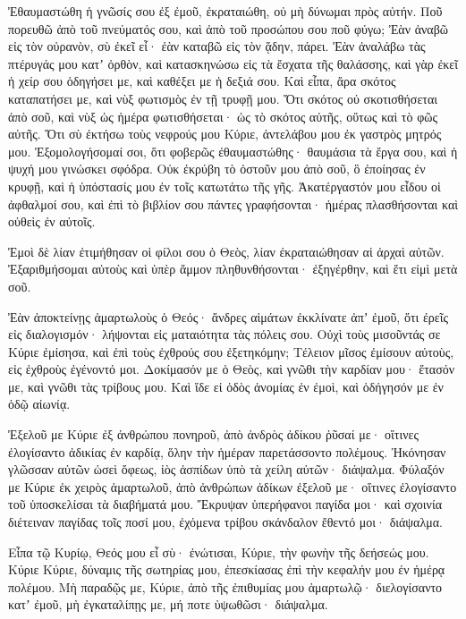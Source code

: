 \begin{spacing}{1.1}
\begin{multicols}{2}
Ἐθαυμαστώθη ἡ γνῶσίς σου ἐξ ἐμοῦ, ἐκραταιώθη, οὐ μὴ δύνωμαι πρὸς αὐτήν.
Ποῦ πορευθῶ ἀπὸ τοῦ πνεύματός σου, καὶ ἀπὸ τοῦ προσώπου σου ποῦ φύγω;
Ἐὰν ἀναβῶ εἰς τὸν οὐρανὸν, σὺ ἐκεῖ εἶ· ἐὰν καταβῶ εἰς τὸν ᾅδην, πάρει.
Ἐὰν ἀναλάβω τὰς πτέρυγάς μου κατʼ ὀρθὸν, καὶ κατασκηνώσω εἰς τὰ ἔσχατα τῆς θαλάσσης,
καὶ γὰρ ἐκεῖ ἡ χείρ σου ὁδηγήσει με, καὶ καθέξει με ἡ δεξιά σου.
Καὶ εἶπα, ἄρα σκότος καταπατήσει με, καὶ νὺξ φωτισμὸς ἐν τῇ τρυφῇ μου.
Ὅτι σκότος οὐ σκοτισθήσεται ἀπὸ σοῦ, καὶ νὺξ ὡς ἡμέρα φωτισθήσεται· ὡς τὸ σκότος αὐτῆς, οὕτως καὶ τὸ φῶς αὐτῆς.
Ὅτι σὺ ἐκτήσω τοὺς νεφρούς μου Κύριε, ἀντελάβου μου ἐκ γαστρὸς μητρός μου.
Ἐξομολογήσομαί σοι, ὅτι φοβερῶς ἐθαυμαστώθης· θαυμάσια τὰ ἔργα σου, καὶ ἡ ψυχή μου γινώσκει σφόδρα.
Οὐκ ἐκρύβη τὸ ὀστοῦν μου ἀπὸ σοῦ, ὃ ἐποίησας ἐν κρυφῇ, καὶ ἡ ὑπόστασίς μου ἐν τοῖς κατωτάτω τῆς γῆς.
Ἀκατέργαστόν μου εἶδου οἱ ἀφθαλμοί σου, καὶ ἐπὶ τὸ βιβλίον σου πάντες γραφήσονται· ἡμέρας πλασθήσονται καὶ οὐθεὶς ἐν αὐτοῖς.

Ἐμοὶ δὲ λίαν ἐτιμήθησαν οἱ φίλοι σου ὁ Θεὸς, λίαν ἐκραταιώθησαν αἱ ἀρχαὶ αὐτῶν.
Ἐξαριθμήσομαι αὐτοὺς καὶ ὑπὲρ ἄμμον πληθυνθήσονται· ἐξηγέρθην, καὶ ἔτι εἰμὶ μετὰ σοῦ.

Ἐὰν ἀποκτείνῃς ἁμαρτωλοὺς ὁ Θεός· ἄνδρες αἱμάτων ἐκκλίνατε ἀπʼ ἐμοῦ,
ὅτι ἐρεῖς εἰς διαλογισμόν· λήψονται εἰς ματαιότητα τὰς πόλεις σου.
Οὐχὶ τοὺς μισοῦντάς σε Κύριε ἐμίσησα, καὶ ἐπὶ τοὺς ἐχθρούς σου ἐξετηκόμην;
Τέλειον μῖσος ἐμίσουν αὐτοὺς, εἰς ἐχθροὺς ἐγένοντό μοι.
Δοκίμασόν με ὁ Θεὸς, καὶ γνῶθι τὴν καρδίαν μου· ἔτασόν με, καὶ γνῶθι τὰς τρίβους μου.
Καὶ ἴδε εἰ ὁδὸς ἀνομίας ἐν ἐμοὶ, καὶ ὁδήγησόν με ἐν ὁδῷ αἰωνίᾳ.

Ἐξελοῦ με Κύριε ἐξ ἀνθρώπου πονηροῦ, ἀπὸ ἀνδρὸς ἀδίκου ῥῦσαί με·
οἵτινες ἐλογίσαντο ἀδικίας ἐν καρδίᾳ, ὅλην τὴν ἡμέραν παρετάσσοντο πολέμους.
Ἠκόνησαν γλῶσσαν αὐτῶν ὡσεὶ ὄφεως, ἰὸς ἀσπίδων ὑπὸ τὰ χείλη αὐτῶν· διάψαλμα.
Φύλαξόν με Κύριε ἐκ χειρὸς ἁμαρτωλοῦ, ἀπὸ ἀνθρώπων ἀδίκων ἐξελοῦ με· οἵτινες ἐλογίσαντο τοῦ ὑποσκελίσαι τὰ διαβήματά μου.
Ἔκρυψαν ὑπερήφανοι παγίδα μοι· καὶ σχοινία διέτειναν παγίδας τοῖς ποσί μου, ἐχόμενα τρίβου σκάνδαλον ἔθεντό μοι· διάψαλμα.

Εἶπα τῷ Κυρίῳ, Θεός μου εἶ σὺ· ἐνώτισαι, Κύριε, τὴν φωνὴν τῆς δεήσεώς μου.
Κύριε Κύριε, δύναμις τῆς σωτηρίας μου, ἐπεσκίασας ἐπὶ τὴν κεφαλήν μου ἐν ἡμέρᾳ πολέμου.
Μὴ παραδῷς με, Κύριε, ἀπὸ τῆς ἐπιθυμίας μου ἁμαρτωλῷ· διελογίσαντο κατʼ ἐμοῦ, μὴ ἐγκαταλίπῃς με, μή ποτε ὑψωθῶσι· διάψαλμα.


\end{multicols}
\end{spacing}
